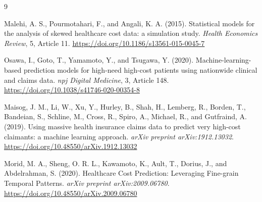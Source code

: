 \documentclass[11pt]{article}
\begin{document}
\begin{thebibliography}{9}

Malehi, A. S., Pourmotahari, F., and Angali, K. A. (2015).
\newblock Statistical models for the analysis of skewed healthcare cost data: a simulation study.
\newblock \textit{Health Economics Review}, 5, Article 11.
\newblock \url{https://doi.org/10.1186/s13561-015-0045-7}

Osawa, I., Goto, T., Yamamoto, Y., and Tsugawa, Y. (2020).
\newblock Machine-learning-based prediction models for high-need high-cost patients using nationwide clinical and claims data.
\newblock \textit{npj Digital Medicine}, 3, Article 148.
\newblock \url{https://doi.org/10.1038/s41746-020-00354-8}

Maisog, J. M., Li, W., Xu, Y., Hurley, B., Shah, H., Lemberg, R., Borden, T., Bandeian, S., Schline, M., Cross, R., Spiro, A., Michael, R., and Gutfraind, A. (2019).
\newblock Using massive health insurance claims data to predict very high-cost claimants: a machine learning approach.
\newblock \textit{arXiv preprint arXiv:1912.13032}.
\newblock \url{https://doi.org/10.48550/arXiv.1912.13032}

Morid, M. A., Sheng, O. R. L., Kawamoto, K., Ault, T., Dorius, J., and Abdelrahman, S. (2020).
\newblock Healthcare Cost Prediction: Leveraging Fine-grain Temporal Patterns.
\newblock \textit{arXiv preprint arXiv:2009.06780}.
\newblock \url{https://doi.org/10.48550/arXiv.2009.06780}

\end{thebibliography}
\end{document}

